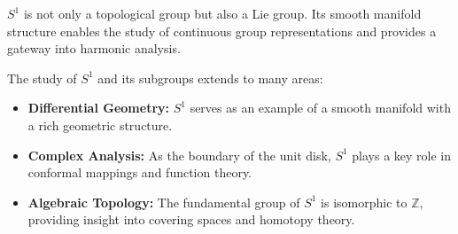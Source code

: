 \documentclass[11pt,openany]{article}
\begin{document}
\(S^1\) is not only a topological group but also a Lie group. Its smooth manifold structure enables the study of continuous group representations and provides a gateway into harmonic analysis.

The study of \(S^1\) and its subgroups extends to many areas:
\begin{itemize}
	\item \textbf{Differential Geometry:} \(S^1\) serves as an example of a smooth manifold with a rich geometric structure.
	\item \textbf{Complex Analysis:} As the boundary of the unit disk, \(S^1\) plays a key role in conformal mappings and function theory.
	\item \textbf{Algebraic Topology:} The fundamental group of \(S^1\) is isomorphic to \(\mathbb{Z}\), providing insight into covering spaces and homotopy theory.
\end{itemize}
\end{document}
